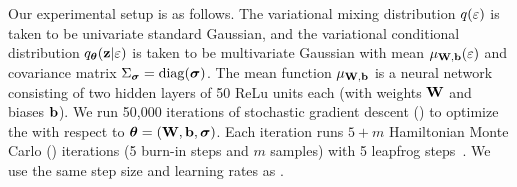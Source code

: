 \documentclass[10pt]{article}
\begin{document}
Our experimental setup is as follows. The variational mixing distribution $q(\varepsilon)$ is taken to be univariate standard Gaussian, and the variational conditional distribution $q_{\bm{\theta}}(\mathbf{z}|\varepsilon)$ is taken to be multivariate Gaussian with mean $\mu_{\mathbf{W},\mathbf{b}}(\varepsilon)$ and covariance matrix $\Sigma_{\bm{\sigma}}=\mathrm{diag}({\bm{\sigma}})$. The mean function $\mu_{\mathbf{W},\mathbf{b}}$ is a neural network consisting of two hidden layers of 50 ReLu units each (with weights $\mathbf{W}$ and biases $\mathbf{b}$). We run 50,000 iterations of stochastic gradient descent (\sgd) to optimize the \elbo with respect to ${\bm{\theta}}=(\mathbf{W},\mathbf{b},{\bm{\sigma}})$. Each iteration runs $5+m$ Hamiltonian Monte Carlo (\hmc) iterations (5 burn-in steps and $m$ \mcmc samples) with 5 leapfrog steps~\citep{Neal:2011}. We use the same step size and learning rates as \citet{Titsias:2019}.
\\
\end{document}
